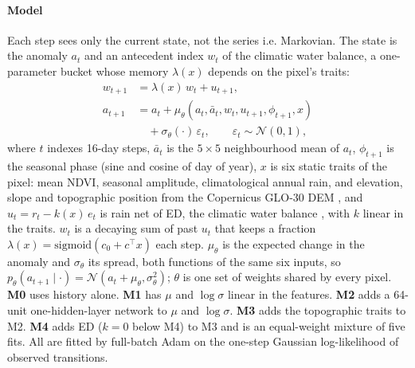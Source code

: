 \documentclass[letterpaper]{article} %
\begin{document}
\paragraph{Model} Each step sees only the current state, not the series i.e. Markovian. The state is the anomaly $a_t$ and an antecedent index $w_t$ of the climatic water balance, a one-parameter bucket whose memory $\lambda(x)$ depends on the pixel's traits:
\begin{align}
w_{t+1} &= \lambda(x)\,w_t + u_{t+1}, \nonumber\\
a_{t+1} &= a_t + \mu_\theta(a_t, \bar a_t, w_t, u_{t+1}, \phi_{t+1}, x) \nonumber\\
&\quad + \sigma_\theta(\cdot)\,\varepsilon_t,\qquad \varepsilon_t\sim\mathcal N(0,1),
\label{eq:model}
\end{align}
where $t$ indexes 16-day steps, $\bar a_t$ is the $5\times5$ neighbourhood mean of $a_t$, $\phi_{t+1}$ is the seasonal phase (sine and cosine of day of year), $x$ is six static traits of the pixel: mean NDVI, seasonal amplitude, climatological annual rain, and elevation, slope and topographic position from the Copernicus GLO-30 DEM \citep{copdem}, and $u_t=r_t-k(x)\,e_t$ is rain net of ED, the climatic water balance \citep{spei}, with $k$ linear in the traits. $w_t$ is a decaying sum of past $u_t$ that keeps a fraction $\lambda(x)=\mathrm{sigmoid}(c_0+c^\top x)$ each step. $\mu_\theta$ is the expected change in the anomaly and $\sigma_\theta$ its spread, both functions of the same six inputs, so $p_\theta(a_{t+1}\mid\cdot)=\mathcal N(a_t+\mu_\theta,\sigma_\theta^2)$; $\theta$ is one set of weights shared by every pixel. \textbf{M0} uses history alone. \textbf{M1} has $\mu$ and $\log\sigma$ linear in the features. \textbf{M2} adds a 64-unit one-hidden-layer network to $\mu$ and $\log\sigma$. \textbf{M3} adds the topographic traits to M2. \textbf{M4} adds ED ($k=0$ below M4) to M3 and is an equal-weight mixture of five fits. All are fitted by full-batch Adam on the one-step Gaussian log-likelihood of observed transitions.
\end{document}
